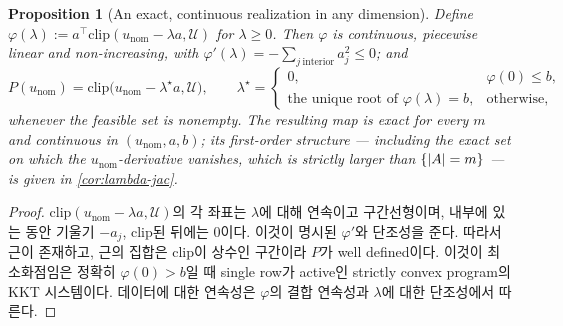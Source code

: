 \documentclass[11pt]{article}
\theoremstyle{plain}
\newtheorem{proposition}[theorem]{Proposition}
\theoremstyle{definition}
\theoremstyle{remark}
\DeclarePairedDelimiter{\abs}{\lvert}{\rvert}
\newcommand{\calU}{\mathcal{U}}
\newcommand{\eqdef}{:=}
\begin{document}
\begin{proposition}[An exact, continuous realization in any dimension]\label{prop:lambda-solve}
Define $\varphi(\lambda)\eqdef a^\top\mathrm{clip}(u_{\mathrm{nom}}-\lambda a,\calU)$ for
$\lambda\ge0$. Then $\varphi$ is continuous, piecewise linear and non-increasing, with
$\varphi'(\lambda)=-\sum_{j\ \mathrm{interior}}a_j^2\le0$; and
\begin{equation}
P(u_{\mathrm{nom}})=\mathrm{clip}\big(u_{\mathrm{nom}}-\lambda^\star a,\calU\big),
\qquad
\lambda^\star=\begin{cases}
0,&\varphi(0)\le b,\\
\text{the unique root of }\varphi(\lambda)=b,&\text{otherwise,}
\end{cases}
\end{equation}
whenever the feasible set is nonempty. The resulting map is exact for every $m$ and continuous in $(u_{\mathrm{nom}},a,b)$; its
first-order structure --- including the exact set on which the $u_{\mathrm{nom}}$-derivative
vanishes, which is strictly larger than $\{\abs A=m\}$ --- is given in \cref{cor:lambda-jac}.
\end{proposition}
\begin{proof}
$\mathrm{clip}(u_{\mathrm{nom}}-\lambda a,\calU)$의 각 좌표는 $\lambda$에 대해 연속이고
구간선형이며, 내부에 있는 동안 기울기 $-a_j$, clip된 뒤에는 $0$이다. 이것이 명시된 $\varphi'$와
단조성을 준다. 따라서 근이 존재하고, 근의 집합은 $\mathrm{clip}$이 상수인 구간이라 $P$가 well
defined이다. 이것이 최소화점임은 정확히 $\varphi(0)>b$일 때 single row가 active인 strictly convex
program의 KKT 시스템이다. 데이터에 대한 연속성은 $\varphi$의 결합 연속성과 $\lambda$에 대한
단조성에서 따른다.
\end{proof}
\end{document}
